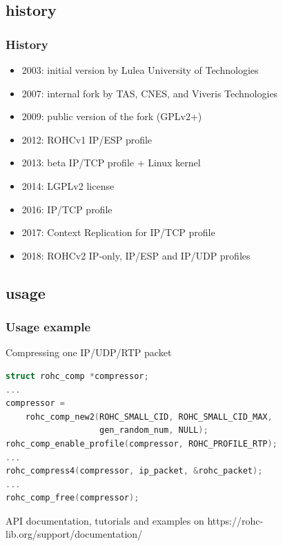 \documentclass[utf8]{beamer}
\begin{document}
\subsection{history}
\begin{frame}
	\frametitle{History}
	\begin{block}{}
		\begin{itemize}
			\item 2003: initial version by Lulea University of Technologies
			\item 2007: internal fork by TAS, CNES, and Viveris Technologies
			\item 2009: public version of the fork (GPLv2+)
				\pause
			\item 2012: ROHCv1 IP/ESP profile
			\item 2013: beta IP/TCP profile + Linux kernel
			\item 2014: LGPLv2 license
				\pause
			\item 2016: IP/TCP profile
			\item 2017: Context Replication for IP/TCP profile
			\item 2018: ROHCv2 IP-only, IP/ESP and IP/UDP profiles
		\end{itemize}
	\end{block}
\end{frame}

\subsection{usage}
\begin{frame}[fragile]
	\frametitle{Usage example}
	\begin{block}{Compressing one IP/UDP/RTP packet}
	\begin{lstlisting}[language=C]
struct rohc_comp *compressor;
...
compressor =
	rohc_comp_new2(ROHC_SMALL_CID, ROHC_SMALL_CID_MAX,
	               gen_random_num, NULL);
rohc_comp_enable_profile(compressor, ROHC_PROFILE_RTP);
...
rohc_compress4(compressor, ip_packet, &rohc_packet);
...
rohc_comp_free(compressor);
	\end{lstlisting}
	\end{block}
	\scriptsize{API documentation, tutorials and examples on https://rohc-lib.org/support/documentation/}
\end{frame}
\end{document}
